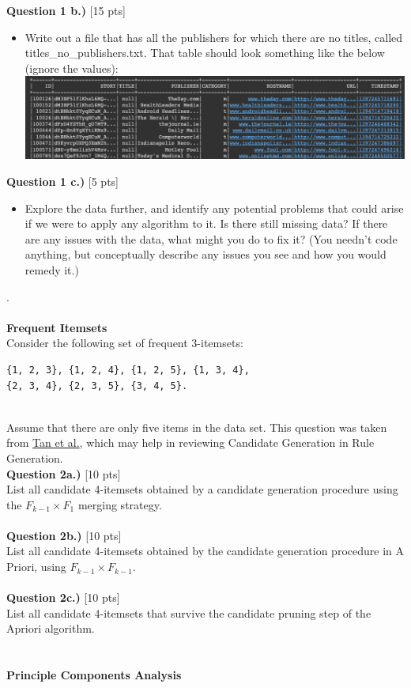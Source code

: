 \documentclass[paper=a4, fontsize=11pt]{scrartcl} %
\begin{document}
{\Large \textbf{Question 1 b.)} [15 pts]}
\begin{itemize}
    \item Write out a file that has all the publishers for which there are no titles, called titles\_no\_publishers.txt. That table should look something like the below (ignore the values): \\
    \includegraphics[width=150mm]{images/title_no_pub.png} \\
\end{itemize} 

{\Large \textbf{Question 1 c.)} [5 pts]} \\
\begin{itemize}
\item Explore the data further, and identify any potential problems that could arise if we were to apply any algorithm to it. Is there still missing data? If there are any issues with the data, what might you do to fix it? (You needn't code anything, but conceptually describe any issues you see and how you would remedy it.)
\end{itemize}
.\\
\\
{\huge \textbf{Frequent Itemsets}} \\

Consider the following set of frequent 3-itemsets:

\begin{verbatim}
{1, 2, 3}, {1, 2, 4}, {1, 2, 5}, {1, 3, 4}, 
{2, 3, 4}, {2, 3, 5}, {3, 4, 5}.
\end{verbatim} \\

Assume that there are only five items in the data set. This question was taken from \href{https://www-users.cse.umn.edu/~kumar001/dmbook/ch5_association_analysis.pdf}{Tan et al.}, which may help in reviewing Candidate Generation in Rule Generation.\\

{\Large \textbf{Question 2a.)} [10 pts]} \\
List all candidate 4-itemsets obtained by a candidate generation procedure using the $F_{k - 1} \times F_1$ merging strategy. \\
\\
{\Large \textbf{Question 2b.)} [10 pts]} \\
List all candidate 4-itemsets obtained by the candidate generation procedure in A Priori, using $F_{k-1} \times F_{k-1}$. \\
\\
{\Large \textbf{Question 2c.)} [10 pts]} \\
List all candidate 4-itemsets that survive the candidate pruning step of
the Apriori algorithm. \\
\\
\\
{\huge \textbf{Principle Components Analysis}} \\
\end{document}
